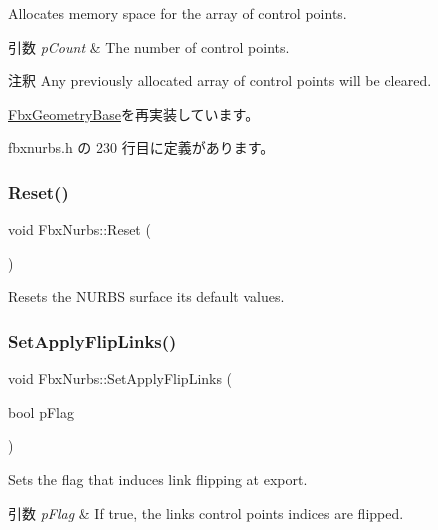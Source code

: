 Allocates memory space for the array of control points. 
\begin{DoxyParams}{引数}
{\em p\+Count} & The number of control points. \\
\hline
\end{DoxyParams}
\begin{DoxyRemark}{注釈}
Any previously allocated array of control points will be cleared. 
\end{DoxyRemark}


\hyperlink{class_fbx_geometry_base_a471b736f2595c006a338c07a61907127}{Fbx\+Geometry\+Base}を再実装しています。



 fbxnurbs.\+h の 230 行目に定義があります。

\mbox{\label{class_fbx_nurbs_a2796c708ff8e01b1fd7d1f4d0a02cb5f}} 
\subsubsection{\texorpdfstring{Reset()}{Reset()}}
{\footnotesize\ttfamily void Fbx\+Nurbs\+::\+Reset (\begin{DoxyParamCaption}{ }\end{DoxyParamCaption})}



Resets the N\+U\+R\+BS surface its default values. 

\mbox{\label{class_fbx_nurbs_a9e251f61538745bef6ebd5560f52a61f}} 
\subsubsection{\texorpdfstring{Set\+Apply\+Flip\+Links()}{SetApplyFlipLinks()}}
{\footnotesize\ttfamily void Fbx\+Nurbs\+::\+Set\+Apply\+Flip\+Links (\begin{DoxyParamCaption}\item[{bool}]{p\+Flag }\end{DoxyParamCaption})}

Sets the flag that induces link flipping at export. 
\begin{DoxyParams}{引数}
{\em p\+Flag} & If {\ttfamily true}, the links control points indices are flipped. \\
\hline
\end{DoxyParams}
\mbox{\label{class_fbx_nurbs_ab5f463575449cbc5734258f061f3c9ba}} 

